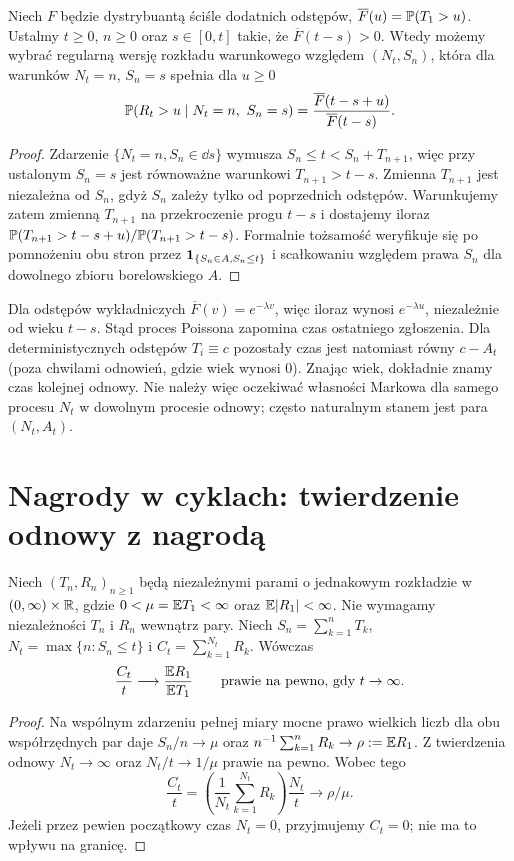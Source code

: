 \begin{stwierdzenie}
Niech $F$ będzie dystrybuantą ściśle dodatnich odstępów,
$\overline F(u)=\mathbb{P}(T_1>u)$.
Ustalmy $t\ge0$, $n\ge0$ oraz $s\in[0,t]$ takie, że
$\overline F(t-s)>0$. Wtedy możemy wybrać regularną wersję rozkładu
warunkowego względem $(N_t,S_n)$, która dla
warunków $N_t=n$, $S_n=s$ spełnia dla $u\ge0$
\[
\mathbb{P}(R_t>u\mid N_t=n,\ S_n=s)
=\frac{\overline F(t-s+u)}{\overline F(t-s)}.
\]
\end{stwierdzenie}
\begin{proof}
Zdarzenie $\{N_t=n,S_n\in\dd s\}$ wymusza
$S_n\le t<S_n+T_{n+1}$, więc przy ustalonym
$S_n=s$ jest równoważne warunkowi $T_{n+1}>t-s$.
Zmienna $T_{n+1}$ jest niezależna od $S_n$, gdyż
$S_n$ zależy tylko od poprzednich odstępów.
Warunkujemy zatem zmienną $T_{n+1}$ na przekroczenie
progu $t-s$ i dostajemy iloraz
$\mathbb{P}(T_{n+1}>t-s+u)/\mathbb{P}(T_{n+1}>t-s)$.
Formalnie tożsamość weryfikuje się po pomnożeniu obu stron
przez $\mathbf{1}_{\{S_n\in A,S_n\le t\}}$ i scałkowaniu względem
prawa $S_n$ dla dowolnego zbioru borelowskiego $A$.
\end{proof}

\begin{przyklad}
Dla odstępów wykładniczych $\overline F(v)=e^{-\lambda v}$,
więc iloraz wynosi $e^{-\lambda u}$, niezależnie od wieku
$t-s$. Stąd proces Poissona zapomina czas ostatniego zgłoszenia.
Dla deterministycznych odstępów $T_i\equiv c$ pozostały czas
jest natomiast równy $c-A_t$ (poza chwilami odnowień, gdzie
wiek wynosi $0$). Znając wiek, dokładnie znamy czas kolejnej
odnowy. Nie należy więc oczekiwać własności Markowa dla
samego procesu $N_t$ w dowolnym procesie odnowy; często
naturalnym stanem jest para $(N_t,A_t)$.
\end{przyklad}

\section{Nagrody w cyklach: twierdzenie odnowy z nagrodą}
\begin{twierdzenie}
Niech $(T_n,R_n)_{n\ge1}$ będą niezależnymi parami o jednakowym
rozkładzie w $(0,\infty)\times\mathbb{R}$, gdzie
$0<\mu=\mathbb{E} T_1<\infty$ oraz $\mathbb{E}|R_1|<\infty$.
Nie wymagamy niezależności $T_n$ i $R_n$ wewnątrz pary.
Niech $S_n=\sum_{k=1}^nT_k$, $N_t=\max\{n:S_n\le t\}$ i
$C_t=\sum_{k=1}^{N_t}R_k$. Wówczas
\[
\frac{C_t}{t}\longrightarrow\frac{\mathbb{E} R_1}{\mathbb{E} T_1}
\qquad\text{prawie na pewno, gdy }t\to\infty.
\]
\end{twierdzenie}
\begin{proof}
Na wspólnym zdarzeniu pełnej miary mocne prawo wielkich liczb
dla obu współrzędnych par daje
$S_n/n\to\mu$ oraz $n^{-1}\sum_{k=1}^nR_k\to\rho:=\mathbb{E} R_1$.
Z twierdzenia odnowy $N_t\to\infty$ oraz
$N_t/t\to1/\mu$ prawie na pewno. Wobec tego
\[
\frac{C_t}{t}=
\left(\frac{1}{N_t}\sum_{k=1}^{N_t}R_k\right)
\frac{N_t}{t}\longrightarrow\rho/\mu.
\]
Jeżeli przez pewien początkowy czas $N_t=0$, przyjmujemy
$C_t=0$; nie ma to wpływu na granicę.
\end{proof}

